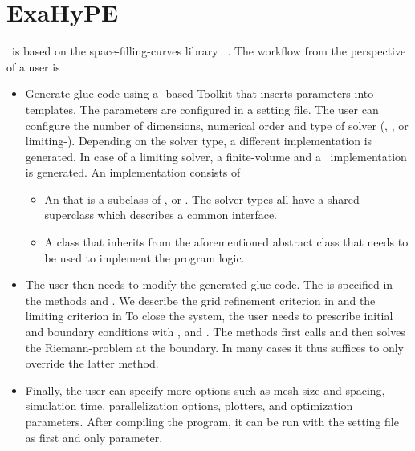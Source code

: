 \section{ExaHyPE}
\exahype\ is based on the space-filling-curves library \peano~\cite{weinzierl2011}.
The workflow from the perspective of a user is
\begin{itemize}
\item Generate glue-code using a -based Toolkit that inserts parameters into templates.
  The parameters are configured in a setting file.
  The user can configure the number of dimensions, numerical order and type of solver (\aderdg{}, \muscl, or limiting-\aderdg).
  Depending on the solver type, a different implementation is generated.
  In case of a limiting solver, a finite-volume and a \dg\ implementation is generated.
  An implementation consists of
  \begin{itemize}
  \item An  that is a subclass of ,  or .
    The solver types all have a shared superclass  which describes a common interface.
  \item A class that inherits from the aforementioned abstract class that needs to be used to implement the program logic.
  \end{itemize}
  
\item The user then needs to modify the generated glue code.
  The \pde{} is specified in the methods  and .
  We describe the grid refinement criterion in  and the limiting criterion in 
  To close the system, the user needs to prescribe initial and boundary conditions with ,  and .
  The methods  first calls  and then solves the Riemann-problem at the boundary.
  In many cases it thus suffices to only override the latter method.
\item Finally, the user can specify more options such as mesh size and spacing, simulation time, parallelization options, plotters, and optimization parameters.
 After compiling the program, it can be run with the setting file as first and only parameter.
\end{itemize}

